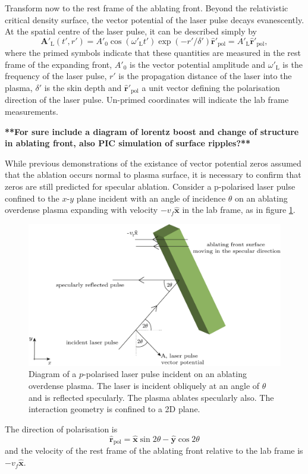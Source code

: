 Transform now to the rest frame of the ablating front. Beyond the relativistic critical density surface, the vector potential of the laser pulse decays evanescently. At the spatial centre of the laser pulse, it can be described simply by
\begin{equation}
	\mathbf{A}'_\mathrm{L}(t',r') = A'_0\cos(\omega'_\mathrm{L}t')\exp(-r'/\delta')\hat{\mathbf{r}}'_\mathrm{pol}= A'_\mathrm{L}\hat{\mathbf{r}}'_\mathrm{pol},
\end{equation}
where the primed symbols indicate that these quantities are measured in the rest frame of the expanding front, $A'_0$ is the vector potential amplitude and $\omega'_\mathrm{L}$ is the frequency of the laser pulse, $r'$ is the propagation distance of the laser into the plasma, $\delta'$ is the skin depth and $\hat{\mathbf{r}}'_\mathrm{pol}$ a unit vector defining the polarisation direction of the laser pulse. Un-primed coordinates will indicate the lab frame measurements.

\textbf{**For sure include a diagram of lorentz boost and change of structure in ablating front, also PIC simulation of surface ripples?**}

While previous demonstrations of the existance of vector potential zeros assumed that the ablation occurs normal to plasma surface, it is necessary to confirm that zeros are still predicted for specular ablation. Consider a p-polarised laser pulse confined to the $x$-$y$ plane incident with an angle of incidence $\theta$ on an ablating overdense plasma expanding with velocity $-v_f\hat{\mathbf{x}}$ in the lab frame, as in figure \ref{fig:zvp_ablatingfront}.
\begin{figure}
	\centering
	\includegraphics[width=0.7\linewidth]{figures/zvp/zvp_ablating_front}
	\caption[Diagram of a $p$-polarised laser pulse incident on an ablating overdense plasma.]{Diagram of a $p$-polarised laser pulse incident on an ablating overdense plasma. The laser is incident obliquely at an angle of $\theta$ and is reflected specularly. The plasma ablates specularly also. The interaction geometry is confined to a 2D plane.}
	\label{fig:zvp_ablatingfront}
\end{figure}
The direction of polarisation is
\begin{equation}
	\hat{\mathbf{r}}_\mathrm{pol} = \hat{\mathbf{x}}\sin{2\theta} - \hat{\mathbf{y}}\cos{2\theta}
\end{equation}
and the velocity of the rest frame of the ablating front relative to the lab frame is $-v_f\hat{\mathbf{x}}$.


